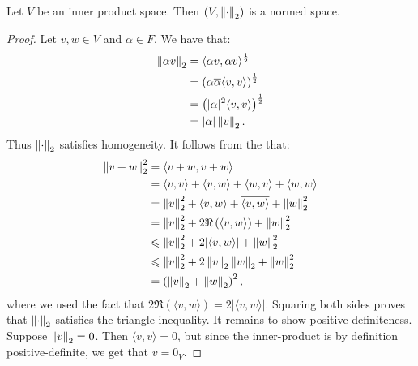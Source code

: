     \begin{theorem}
        Let $V$ be an inner product space. Then $(V,\left\lVert \cdot \right\rVert_2)$ is a normed space.
    \end{theorem}
        \begin{proof}
            Let $v,w \in V$ and $\alpha \in F$. We have that:
                \begin{equation*}
                \begin{split}
                    \left\lVert \alpha v \right\rVert_2 
                    & = \langle \alpha v , \alpha v \rangle^\frac{1}{2} \\
                    & = \left( \alpha \overline{\alpha}\langle v,v \rangle \right)^\frac{1}{2} \\
                    & = \left( |\alpha|^2 \langle v,v \rangle\right)^\frac{1}{2}\\
                    & = |\alpha|\left\lVert v \right\rVert_2.
                \end{split}
                \end{equation*}
            Thus $\left\lVert \cdot \right\rVert_2$ satisfies homogeneity. It follows from the  that:
                \begin{equation*}
                \begin{split}
                    \left\lVert v+w \right\rVert_2^2
                    & = \langle v+w,v+w \rangle \\
                    & = \langle v,v \rangle + \langle v,w \rangle + \langle w,v \rangle + \langle w,w \rangle \\
                    & = \left\lVert v \right\rVert_2^2 + \langle v,w \rangle + \overline{\langle v,w \rangle} + \left\lVert w \right\rVert_2^2 \\
                    & = \left\lVert v \right\rVert_2^2 + 2\Re \left( \langle v,w \rangle \right) + \left\lVert w \right\rVert_2^2 \\
                    & \leqslant \left\lVert v \right\rVert_2^2 + 2|\langle v,w \rangle| + \left\lVert w \right\rVert_2^2 \\
                    & \leqslant \left\lVert v \right\rVert_2^2 + 2 \left\lVert v \right\rVert_2 \left\lVert w \right\rVert_2 + \left\lVert w \right\rVert_2^2 \\
                    & = \left( \left\lVert v \right\rVert_2 + \left\lVert w \right\rVert_2 \right)^2,
                \end{split}
                \end{equation*}
            where we used the fact that $2\Re (\langle v,w \rangle) = 2|\langle v,w \rangle|$. Squaring both sides proves that $\left\lVert \cdot \right\rVert_2$ satisfies the triangle inequality. It remains to show positive-definiteness. Suppose $\left\lVert v \right\rVert_2 = 0$. Then $\langle v,v \rangle = 0$, but since the inner-product is by definition positive-definite, we get that $v = 0_V$.
        \end{proof}

